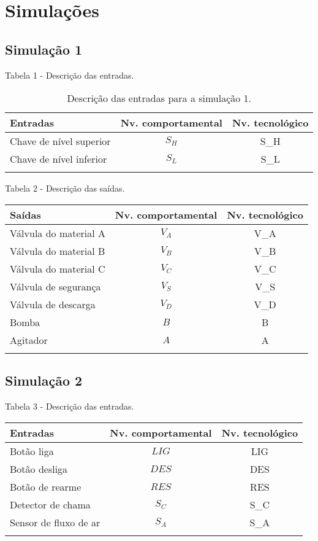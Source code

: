 \hypertarget{simulauxe7uxf5es}{%
\section{Simulações}\label{simulauxe7uxf5es}}

\hypertarget{simulauxe7uxe3o-1}{%
\subsection{Simulação 1}\label{simulauxe7uxe3o-1}}


Tabela 1 - Descrição das entradas.

\begin{longtable}[]{@{}lcc@{}}
\toprule
Entradas & Nv. comportamental & Nv. tecnológico \\
\midrule
\endhead
Chave de nível superior & \(S_H\) & S\_H \\
Chave de nível inferior & \(S_L\) & S\_L \\
\bottomrule
\caption{Descrição das entradas para a simulação 1.}
\label{tbl:1}
\end{longtable}

Tabela 2 - Descrição das saídas.

\begin{longtable}[]{@{}lcc@{}}
\toprule
Saídas & Nv. comportamental & Nv. tecnológico \\
\midrule
\endhead
Válvula do material A & \(V_A\) & V\_A \\
Válvula do material B & \(V_B\) & V\_B \\
Válvula do material C & \(V_C\) & V\_C \\
Válvula de segurança & \(V_S\) & V\_S \\
Válvula de descarga & \(V_D\) & V\_D \\
Bomba & \(B\) & B \\
Agitador & \(A\) & A \\
\bottomrule
\label{tbl:2}
\end{longtable}

\hypertarget{simulauxe7uxe3o-2}{%
\subsection{Simulação 2}\label{simulauxe7uxe3o-2}}

Tabela 3 - Descrição das entradas.

\begin{longtable}[]{@{}lcc@{}}
\toprule
Entradas & Nv. comportamental & Nv. tecnológico \\
\midrule
\endhead
Botão liga & \(LIG\) & LIG \\
Botão desliga & \(DES\) & DES \\
Botão de rearme & \(RES\) & RES \\
Detector de chama & \(S_C\) & S\_C \\
Sensor de fluxo de ar & \(S_A\) & S\_A \\
\bottomrule
\label{tbl:3}
\end{longtable}

